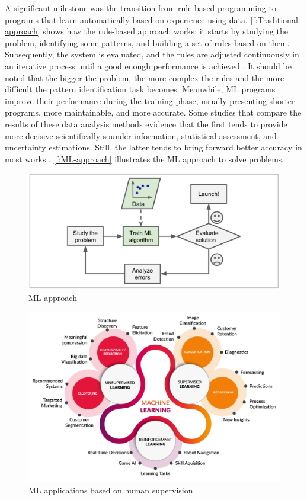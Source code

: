 A significant milestone was the transition from rule-based programming to programs that learn automatically based on experience using data. \autoref{f:Traditional-approach} shows how the rule-based approach works; it starts by studying the problem, identifying some patterns, and building a set of rules based on them. Subsequently, the system is evaluated, and the rules are adjusted continuously in an iterative process until a good enough performance is achieved \cite{geron2017}. It should be noted that the bigger the problem, the more complex the rules and the more difficult the pattern identification task becomes. Meanwhile, \ac{ML} programs improve their performance during the training phase, usually presenting shorter programs, more maintainable, and more accurate. Some studies that compare the results of these data analysis methods evidence that the first tends to provide more decisive scientifically sounder information, statistical assessment, and uncertainty estimations. Still, the latter tends to bring forward better accuracy in most works \cite{geron2017,Ye2020}. \autoref{f:ML-approach} illustrates the \ac{ML} approach to solve problems.


\begin{figure}[t]
\centering
\includegraphics[width=14cm]{figures/Ch2/Ml-Approach.pdf}
\caption{ML approach \cite{geron2017}}
\label{f:ML-approach}
\end{figure}

\begin{figure}[h]
\centering
\includegraphics[width=\linewidth]{figures/Ch2/ML-Applications-by-type.pdf}
\caption{ML applications based on human supervision}
\label{f:ML-App-by-type}
\end{figure}

